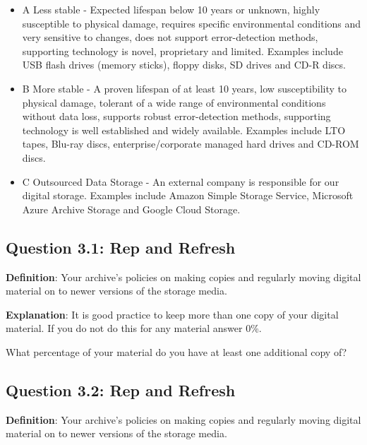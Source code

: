 \documentclass[a4paper,oneside]{article}
\providecommand{\tightlist}{%
    \setlength{\itemsep}{2pt}\setlength{\parskip}{0pt}}
\begin{document}
\begin{landscape}
\begin{itemize}
\tightlist
\item
  A Less stable - Expected lifespan below 10 years or unknown, highly susceptible to physical damage, requires specific environmental conditions and very sensitive to changes, does not support error-detection methods, supporting technology is novel, proprietary and limited. Examples include USB flash drives (memory sticks), floppy disks, SD drives and CD-R discs.\\
\item
  B More stable - A proven lifespan of at least 10 years, low susceptibility to physical damage, tolerant of a wide range of environmental conditions without data loss, supports robust error-detection methods, supporting technology is well established and widely available. Examples include LTO tapes, Blu-ray discs, enterprise/corporate managed hard drives and CD-ROM discs.\\
\item
  C Outsourced Data Storage - An external company is responsible for our digital storage. Examples include Amazon Simple Storage Service, Microsoft Azure Archive Storage and Google Cloud Storage.
\end{itemize}

\newpage

\hypertarget{question-3.1-rep-and-refresh}{%
\subsection{Question 3.1: Rep and Refresh}\label{question-3.1-rep-and-refresh}}

\textbf{Definition}: Your archive's policies on making copies and regularly moving digital material on to newer versions of the storage media.

\textbf{Explanation}: It is good practice to keep more than one copy of your digital material. If you do not do this for any material answer 0\%.

What percentage of your material do you have at least one additional copy of?

\newpage

\hypertarget{question-3.2-rep-and-refresh}{%
\subsection{Question 3.2: Rep and Refresh}\label{question-3.2-rep-and-refresh}}

\textbf{Definition}: Your archive's policies on making copies and regularly moving digital material on to newer versions of the storage media.


\end{landscape}
\end{document}
